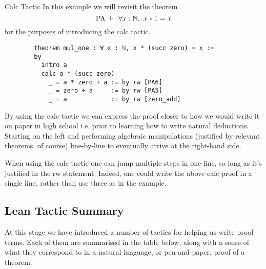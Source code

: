 \documentclass{book}
\begin{document}
\begin{eg}{Calc Tactic}
    In this example we will revisit the theorem $$\text{PA} \ \vdash \ \forall x : \mathbb{N}, \ x * 1 = x$$ for the purposes of introducing the calc tactic. 
    \begin{lstlisting}
        theorem mul_one : ∀ x : ℕ, x * (succ zero) = x :=
        by
          intro a
          calc a * (succ zero)
            _ = a * zero + a := by rw [PA6]
            _ = zero + a     := by rw [PA5]
            _ = a            := by rw [zero_add]
    \end{lstlisting}
    By using the calc tactic we can express the proof closer to how we would write it on paper in high school i.e. prior to learning how to write natural deductions. Starting on the left and performing algebraic manipulations (justified by relevant theorems, of course) line-by-line to eventually arrive at the right-hand side. 
\end{eg}

When using the calc tactic one can jump multiple steps in one-line, so long as it's justified in the rw statement. Indeed, one could write the above calc proof in a single line, rather than use three as in the example. 



\newpage
\subsection*{Lean Tactic Summary}

At this stage we have introduced a number of tactics for helping us write proof-terms. Each of them are summarised in the table below, along with a sense of what they correspond to in a natural language, or pen-and-paper, proof of a theorem. 

\end{document}
